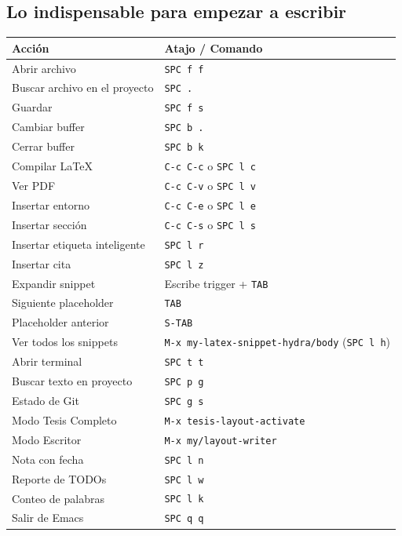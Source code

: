 \documentclass[11pt]{article}
\begin{document}
\subsection{Lo indispensable para empezar a escribir}
\label{sec:orge0e43fc}
\begin{center}
\begin{tabular}{ll}
Acción & Atajo / Comando\\
\hline
Abrir archivo & \texttt{SPC f f}\\
Buscar archivo en el proyecto & \texttt{SPC .}\\
Guardar & \texttt{SPC f s}\\
Cambiar buffer & \texttt{SPC b .}\\
Cerrar buffer & \texttt{SPC b k}\\
Compilar \LaTeX{} & \texttt{C-c C-c} o \texttt{SPC l c}\\
Ver PDF & \texttt{C-c C-v} o \texttt{SPC l v}\\
Insertar entorno & \texttt{C-c C-e} o \texttt{SPC l e}\\
Insertar sección & \texttt{C-c C-s} o \texttt{SPC l s}\\
Insertar etiqueta inteligente & \texttt{SPC l r}\\
Insertar cita & \texttt{SPC l z}\\
Expandir snippet & Escribe trigger + \texttt{TAB}\\
Siguiente placeholder & \texttt{TAB}\\
Placeholder anterior & \texttt{S-TAB}\\
Ver todos los snippets & \texttt{M-x my-latex-snippet-hydra/body} (\texttt{SPC l h})\\
Abrir terminal & \texttt{SPC t t}\\
Buscar texto en proyecto & \texttt{SPC p g}\\
Estado de Git & \texttt{SPC g s}\\
Modo Tesis Completo & \texttt{M-x tesis-layout-activate}\\
Modo Escritor & \texttt{M-x my/layout-writer}\\
Nota con fecha & \texttt{SPC l n}\\
Reporte de TODOs & \texttt{SPC l w}\\
Conteo de palabras & \texttt{SPC l k}\\
Salir de Emacs & \texttt{SPC q q}\\
\end{tabular}
\end{center}
\end{document}
